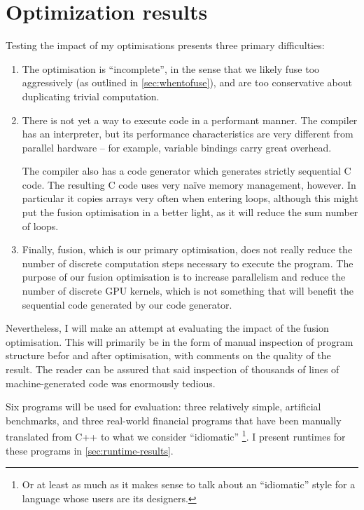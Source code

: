 \chapter{Optimization results}
\label{chap:optimisation-results}

Testing the impact of my optimisations presents three primary
difficulties:

\begin{enumerate}
\item The optimisation is ``incomplete'', in the sense that we likely
  fuse too aggressively (as outlined in \cref{sec:whentofuse}), and
  are too conservative about duplicating trivial computation.

\item There is not yet a way to execute \LO{} code in a performant
  manner.  The \LO{} compiler has an interpreter, but its performance
  characteristics are very different from parallel hardware -- for
  example, variable bindings carry great overhead.

  The compiler also has a code generator which generates strictly
  sequential C code.  The resulting C code uses very naïve memory
  management, however.  In particular it copies arrays very often when
  entering loops, although this might put the fusion optimisation in a
  better light, as it will reduce the sum number of loops.

\item Finally, fusion, which is our primary optimisation, does not
  really reduce the number of discrete computation steps necessary to
  execute the program.  The purpose of our fusion optimisation is to
  increase parallelism and reduce the number of discrete GPU kernels,
  which is not something that will benefit the sequential code
  generated by our code generator.
\end{enumerate}

Nevertheless, I will make an attempt at evaluating the impact of the
fusion optimisation.  This will primarily be in the form of manual
inspection of program structure befor and after optimisation, with
comments on the quality of the result.  The reader can be assured that
said inspection of thousands of lines of machine-generated code was
enormously tedious.

Six programs will be used for evaluation: three relatively simple,
artificial benchmarks, and three real-world financial programs that
have been manually translated from C++ to what we consider
``idiomatic'' \LO{}\footnote{Or at least as much as it makes sense to
  talk about an ``idiomatic'' style for a language whose users are its
  designers.}.  I present runtimes for these programs in
\cref{sec:runtime-results}.


